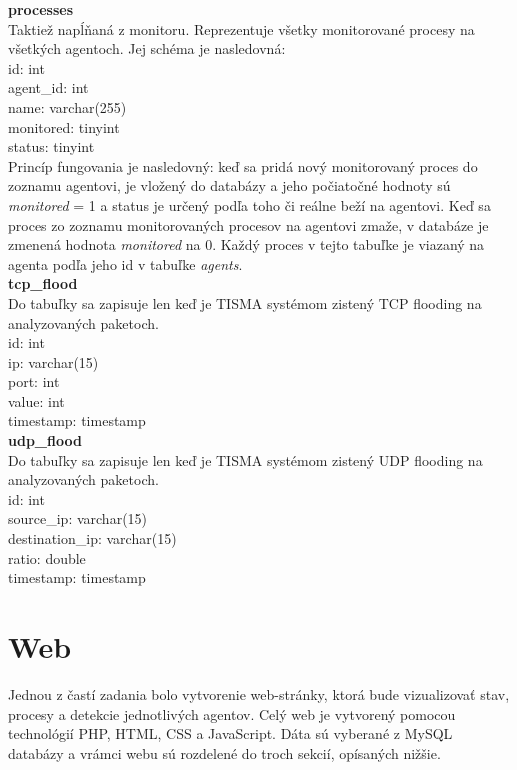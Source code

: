 \documentclass[a4paper,12pt]{article}
\begin{document}
\textbf{processes} \\

Taktiež napĺňaná z monitoru. Reprezentuje všetky monitorované procesy na všetkých agentoch. Jej schéma je nasledovná: \\

\noindent id: int \\
agent\_id: int \\
name: varchar(255) \\
monitored: tinyint \\
status: tinyint \\

Princíp fungovania je nasledovný: keď sa pridá nový monitorovaný proces do zoznamu agentovi, je vložený do databázy a jeho počiatočné hodnoty sú \textit{monitored} = 1 a status je určený podľa toho či reálne beží na agentovi. Keď sa proces zo zoznamu monitorovaných procesov na agentovi zmaže, v databáze je zmenená hodnota \textit{monitored} na 0. Každý proces v tejto tabuľke je viazaný na agenta podľa jeho id v tabuľke \textit{agents}. \\

\textbf{tcp\_flood} \\

Do tabuľky sa zapisuje len keď je TISMA systémom zistený TCP flooding na analyzovaných paketoch. \\

\noindent id: int \\
ip: varchar(15) \\
port: int \\
value: int \\
timestamp: timestamp \\

\textbf{udp\_flood} \\

Do tabuľky sa zapisuje len keď je TISMA systémom zistený UDP flooding na analyzovaných paketoch. \\

\noindent id: int \\
source\_ip: varchar(15) \\
destination\_ip: varchar(15) \\
ratio: double \\
timestamp: timestamp \\
\newpage

\section{Web}
Jednou z častí zadania bolo vytvorenie web-stránky, ktorá bude vizualizovať stav, procesy a detekcie jednotlivých agentov. Celý web je vytvorený pomocou technológií PHP, HTML, CSS a JavaScript. Dáta sú vyberané z MySQL databázy a vrámci webu sú rozdelené do troch sekcií, opísaných nižšie. \\
\end{document}
